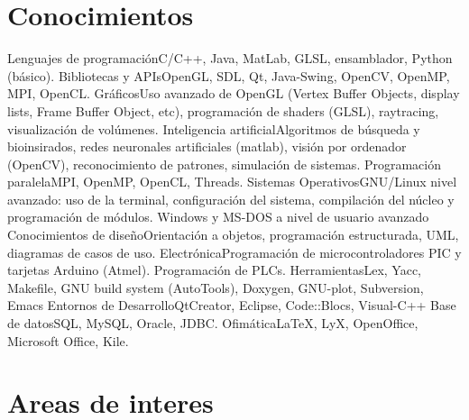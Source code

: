 \documentclass[11pt,a4paper,sans]{moderncv}   %
\begin{document}
\section{Conocimientos}
\cvcomputer
	{Lenguajes de programación}{C/C++, Java, MatLab, GLSL, ensamblador, Python (básico).}
	{Bibliotecas y APIs}{OpenGL, SDL, Qt, Java-Swing, OpenCV, OpenMP, MPI, OpenCL.}
\cvcomputer
	{Gráficos}{Uso avanzado de OpenGL (Vertex Buffer Objects, display lists, Frame Buffer Object, etc), programación de shaders (GLSL), raytracing, visualización de volúmenes.}
	{Inteligencia artificial}{Algoritmos de búsqueda y bioinsirados, redes neuronales artificiales (matlab), visión por ordenador (OpenCV), reconocimiento de patrones, simulación de sistemas.}
\cvcomputer
	{Programación paralela}{MPI, OpenMP, OpenCL, Threads.}
	{Sistemas Operativos}{GNU/Linux nivel avanzado: uso de la terminal, configuración del sistema, compilación del núcleo y programación de módulos. Windows y MS-DOS a nivel de usuario avanzado}
\cvcomputer
	{Conocimientos de diseño}{Orientación a objetos, programación estructurada, UML, diagramas de casos de uso.}
	{Electrónica}{Programación de microcontroladores PIC y tarjetas Arduino (Atmel). Programación de PLCs.}
\cvcomputer
	{Herramientas}{Lex, Yacc, Makefile, GNU build system (AutoTools), Doxygen, GNU-plot, Subversion, Emacs}
	{Entornos de Desarrollo}{QtCreator, Eclipse, Code::Blocs, Visual-C++}
\cvcomputer
	{Base de datos}{SQL, MySQL, Oracle, JDBC.}
	{Ofimática}{\LaTeX, LyX, OpenOffice, Microsoft Office, Kile.}


\section{Areas de interes}

\end{document}
